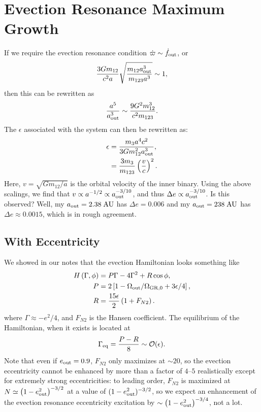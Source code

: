 \documentclass[11pt,
        usenames, %
        dvipsnames %
    ]{article}
\newcommand*{\p}[1]{\left(#1\right)}
\newcommand*{\s}[1]{\left[#1\right]}
\begin{document}
\section{Evection Resonance Maximum Growth}

If we require the evection resonance condition $\dot{\varpi} \sim \dot{f}_{\rm
out}$, or
\begin{equation}
    \frac{3Gm_{12}}{c^2a}\sqrt{\frac{m_{12}a_{\rm out}^3}{m_{123}a^3}} \sim 1,
\end{equation}
then this can be rewritten as
\begin{equation}
    \frac{a^5}{a_{\rm out}^3} \sim \frac{9G^2m_{12}^3}{c^2m_{123}}.
\end{equation}
The $\epsilon$ associated with the system can then be rewritten as:
\begin{align}
    \epsilon &= \frac{m_3 a^4c^2}{3Gm_{12}^2a_{\rm out}^3},\\
        &= \frac{3m_3}{m_{123}}\p{\frac{v}{c}}^2.
\end{align}
Here, $v = \sqrt{Gm_{12}/a}$ is the orbital velocity of the inner binary. Using
the above scalings, we find that $v \propto a^{-1/2} \propto a_{\rm
out}^{-3/10}$, and thus $\Delta e \propto a_{\rm out}^{-3/10}$. Is this
observed? Well, my $a_{\rm out} = 2.38\;\mathrm{AU}$ has $\Delta e = 0.006$ and
my $a_{\rm out} = 238\;\mathrm{AU}$ has $\Delta e \approx 0.0015$, which is in
rough agreement.


\subsection{With Eccentricity}

We showed in our notes that the evection Hamiltonian looks something like
\begin{align}
    H\p{\Gamma, \phi} &= P\Gamma - 4\Gamma^2 + R\cos \phi,\nonumber\\
    P &= 2\s{1 - \Omega_{\rm out} / \Omega_{\rm GR, 0} + 3\epsilon/4},\nonumber\\
    R &= \frac{15\epsilon}{2}\p{1 + F_{N2}}.
\end{align}
where $\Gamma \approx -e^2/4$, and $F_{N2}$ is the Hansen coefficient. The
equilibrium of the Hamiltonian, when it exists is located at
\begin{equation}
    \Gamma_{\rm eq} = \frac{P - R}{8} \sim \mathcal{O}(\epsilon).
\end{equation}
Note that even if $e_{\rm out} = 0.9$, $F_{N2}$ only maximizes at $\sim 20$, so
the evection eccentricity cannot be enhanced by more than a factor of $4$--$5$
realistically except for extremely strong eccentricities: to leading order,
$F_{N2}$ is maximized at $N \simeq \p{1 - e_{\rm out}^2}^{-3/2}$ at a value of
$(1 - e_{\rm out}^2)^{-3/2}$, so we expect an enhancement of the evection
resonance eccentricity excitation by $\sim \p{1 - e_{\rm out}^2}^{-3/4}$, not a
lot.
\end{document}
